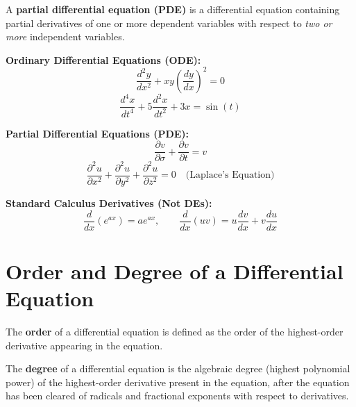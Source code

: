 \documentclass[11pt, a4paper, openany, oneside]{book}
\begin{document}
\begin{definitionbox}
A \textbf{partial differential equation (PDE)} is a differential equation containing partial derivatives of one or more dependent variables with respect to \emph{two or more} independent variables.
\end{definitionbox}

\begin{summarybox}
    \textbf{Ordinary Differential Equations (ODE):}
    \begin{equation}
        \frac{d^2 y}{dx^2} + x y \left(\frac{dy}{dx}\right)^2 = 0
    \end{equation}
    \begin{equation}
        \frac{d^4 x}{dt^4} + 5\frac{d^2 x}{dt^2} + 3x = \sin(t)
    \end{equation}

    \textbf{Partial Differential Equations (PDE):}
    \begin{equation}
        \frac{\partial v}{\partial \sigma} + \frac{\partial v}{\partial t} = v
    \end{equation}
    \begin{equation}
        \frac{\partial^2 u}{\partial x^2} + \frac{\partial^2 u}{\partial y^2} + \frac{\partial^2 u}{\partial z^2} = 0 \quad \text{(Laplace's Equation)}
    \end{equation}

    \textbf{Standard Calculus Derivatives (Not DEs):}
    \begin{equation}
        \frac{d}{dx}\left(e^{ax}\right) = a e^{ax}, \qquad \frac{d}{dx}(u v) = u \frac{dv}{dx} + v \frac{du}{dx}
    \end{equation}
\end{summarybox}

\section{Order and Degree of a Differential Equation}

\begin{definitionbox}
The \textbf{order} of a differential equation is defined as the order of the highest-order derivative appearing in the equation.
\end{definitionbox}

\begin{definitionbox}
The \textbf{degree} of a differential equation is the algebraic degree (highest polynomial power) of the highest-order derivative present in the equation, after the equation has been cleared of radicals and fractional exponents with respect to derivatives.
\end{definitionbox}
\end{document}
